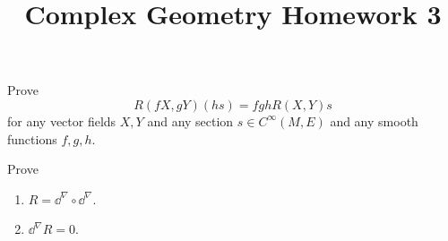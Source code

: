\documentclass[12pt]{article}
\title{Complex Geometry Homework 3}
\author{}
\date{}
\begin{document}
\maketitle
\begin{problem}
    Prove \[
        R(fX,gY)(hs)=fghR(X,Y)s
    \] for any vector fields \(X,Y\) and any section \(s\in C^\infty(M,E)\) and any
    smooth functions \(f,g,h\).
\end{problem}
\begin{problem}
    Prove
    \begin{enumerate}[(1)]
    \item \(R=\dd^\nabla\circ \dd^\nabla\).
    \item \(\dd^\nabla R=0\).
    \end{enumerate}
\end{problem}
\end{document}
